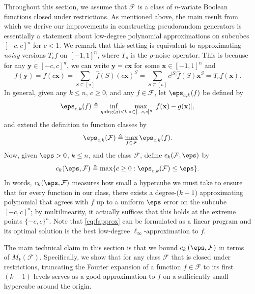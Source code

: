 Throughout this section, we assume that $\mathcal{F}$ is a class of $n$-variate Boolean functions closed under restrictions.  As mentioned above, the main result from which we derive our improvements in constructing pseudorandom generators is essentially a statement about low-degree polynomial approximations on subcubes $[-c,c]^n$ for $c<1$.   We remark that this setting is equivalent to approximating \emph{noisy} versions $T_cf$ on $[-1,1]^n$, where $T_{\rho}$ is the $\rho$-noise operator.  This is because for any $\mathbf{y} \in [-c,c]^n$, we can write $\mathbf{y} = c\mathbf{x}$ for some $\mathbf{x} \in [-1,1]^n$ and
\[
f(\mathbf{y})
=f(c\mathbf{x})
= \sum_{S \subseteq [n]} \hat{f}(S) (c\mathbf{x})^S
= \sum_{S \subseteq [n]} c^{|S|} \hat{f}(S) \mathbf{x}^S
= T_cf(\mathbf{x}) .
\]
In general, given any $k\leq n$, $c\geq 0$, and any $f\in \mathcal{F}$, let $\eps_{c,k}(f)$ be defined by
\begin{equation}
\label{eq:fapprox}
    \eps_{c,k}(f) \triangleq \inf_{g: \mathrm{deg}(g)< k}\max_{\mathbf{x}\in [-c,c]^n}  \vert f(\mathbf{x})-g(\mathbf{x})\vert,
\end{equation}
and extend the definition to function classes by
\begin{equation*}
    \eps_{c,k}(\mathcal{F}) \triangleq \max_{f\in \mathcal{F}} \eps_{c,k}(f).
\end{equation*}
Now, given $\eps>0$, $k\leq n$, and the class $\mathcal{F}$, define $c_k(\mathcal{F},\eps)$ by
\begin{equation*}
    c_k(\eps,\mathcal{F})\triangleq \max\{ c\geq 0: \eps_{c,k}(\mathcal{F})\leq \eps\}.
\end{equation*}
In words, $c_k(\eps,\mathcal{F})$ measures how small a hypercube we must take to ensure that for every function in our class, there exists a degree-($k-1$) approximating polynomial that agrees with $f$ up to a uniform $\eps$ error on the subcube $[-c,c]^n$; by multilinearity, it actually suffices that this holds at the extreme points $\{-c,c\}^n$. Note that \cref{eq:fapprox} can be formulated as a linear program and its optimal solution is the best low-degree  $\ell_{\infty}$-approximation to $f$.


The main technical claim in this section is that we bound $c_k \left( \eps , \mathcal{F} \right)$ in terms of $M_k(\mathcal{F})$.  Specifically, we show that for any class $\mathcal{F}$ that is closed under restrictions, truncating the Fourier expansion of a function $f \in \mathcal{F}$ to its first $(k-1)$ levels serves as a good approximation to $f$ on a sufficiently small hypercube around the origin.

